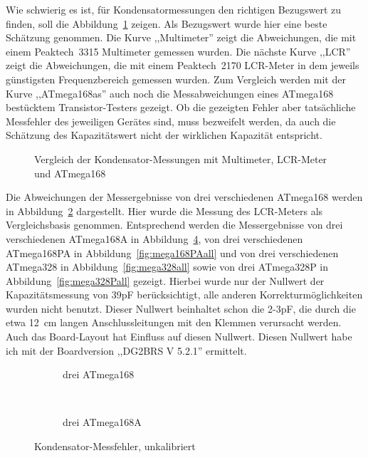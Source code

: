 Wie schwierig es ist, für Kondensatormessungen den richtigen Bezugswert zu finden, soll die Abbildung~\ref{fig:capcompare} zeigen.
Als Bezugswert wurde hier eine beste Schätzung genommen. Die Kurve ,,Multimeter'' zeigt die Abweichungen, die mit einem
Peaktech~3315 Multimeter gemessen wurden.
Die nächste Kurve ,,LCR'' zeigt die Abweichungen, die mit einem Peaktech~2170 LCR-Meter in dem jeweils günstigsten Frequenzbereich gemessen wurden.
Zum Vergleich werden mit der Kurve ,,ATmega168as'' auch noch die Messabweichungen eines ATmega168 bestücktem Transistor-Testers gezeigt.
Ob die gezeigten Fehler aber tatsächliche Messfehler des jeweiligen Gerätes sind, muss bezweifelt werden, da auch die
Schätzung des Kapazitätswert nicht der wirklichen Kapazität entspricht.

\begin{figure}[H]
\centering

\caption{Vergleich der Kondensator-Messungen mit Multimeter, LCR-Meter und ATmega168}
\label{fig:capcompare}
\end{figure}

Die Abweichungen der Messergebnisse von drei verschiedenen ATmega168 werden in Abbildung~\ref{fig:mega168all} dargestellt.
Hier wurde die Messung des LCR-Meters als Vergleichsbasis genommen.
Entsprechend werden die Messergebnisse von drei verschiedenen ATmega168A in Abbildung~\ref{fig:mega168Aall}, 
von drei verschiedenen ATmega168PA in Abbildung~\ref{fig:mega168PAall} und von drei verschiedenen
ATmega328 in Abbildung~\ref{fig:mega328all} sowie von drei ATmega328P in Abbildung~\ref{fig:mega328Pall} gezeigt.
Hierbei wurde nur der Nullwert der Kapazitätsmessung von 39pF berücksichtigt, alle anderen Korrekturmöglichkeiten wurden
nicht benutzt. Dieser Nullwert beinhaltet schon die 2-3pF, die durch die etwa 12~cm langen Anschlussleitungen mit den
Klemmen verursacht werden.
Auch das Board-Layout hat Einfluss auf diesen Nullwert. Diesen Nullwert habe ich mit der Boardversion ,,DG2BRS V 5.2.1'' ermittelt.

\begin{figure}[H]
  \begin{subfigure}[b]{9cm}
    \centering
    \resizebox{9cm}{!}{}
    \caption{drei ATmega168}
    \label{fig:mega168all}
  \end{subfigure}
  ~
  \begin{subfigure}[b]{9cm}
    \centering
    \resizebox{9cm}{!}{}
    \caption{drei ATmega168A}
    \label{fig:mega168Aall}
  \end{subfigure}
  \caption{Kondensator-Messfehler, unkalibriert}
\end{figure}

